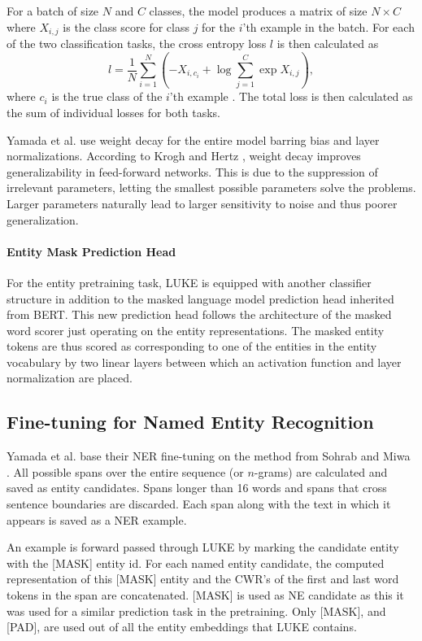 \documentclass[main.tex]{subfiles}
\begin{document}
For a batch of size $ N $ and $ C $ classes, the model produces a matrix of size $ N\times C $ where $ X_{i, j} $ is the class score for class $ j $ for the $ i $'th example in the batch.
For each of the two classification tasks, the cross entropy loss $ l $ is then calculated as
\begin{equation}\label{eq:crossentropyloss}
    l = \frac{1}{N} \sum_{i=1}^N \left(
        -X_{i, c_i} + \log \sum_{j=1}^C \exp X_{i, j}
    \right),
\end{equation}
where $ c_i $ is the true class of the $ i $'th example \cite{pytorchcel}.
The total loss is then calculated as the sum of individual losses for both tasks.

Yamada et al. \cite{yamada2020luke} use weight decay for the entire model barring bias and layer normalizations.
According to Krogh and Hertz \cite{krogh1991weight}, weight decay improves generalizability in feed-forward networks.
This is due to the suppression of irrelevant parameters, letting the smallest possible parameters solve the problems.
Larger parameters naturally lead to larger sensitivity to noise and thus poorer generalization.

\paragraph{Entity Mask Prediction Head}
For the entity pretraining task, LUKE is equipped with another classifier structure in addition to the masked language model prediction head inherited from BERT.
This new prediction head follows the architecture of the masked word scorer just operating on the entity representations.
The masked entity tokens are thus scored as corresponding to one of the entities in the entity vocabulary by two linear layers between which an activation function and layer normalization are placed.

\subsection{Fine-tuning for Named Entity Recognition}
\label{subsec:fine-tuning-theory}
Yamada et al. base their NER fine-tuning on the method from Sohrab and Miwa \cite{sohrab2018nestedner}.
All possible spans over the entire sequence (or $n$-grams) are calculated and saved as entity candidates.
Spans longer than 16 words and spans that cross sentence boundaries are discarded.
Each span along with the text in which it appears is saved as a NER example.

An example is forward passed through LUKE by marking the candidate entity with the [MASK] entity id.
For each named entity candidate, the computed representation of this [MASK] entity and the CWR's of the first and last word tokens in the span are concatenated.
[MASK] is used as NE candidate as this it was used for a similar prediction task in the pretraining.
Only [MASK], and [PAD], are used out of all the entity embeddings that LUKE contains.
\end{document}
